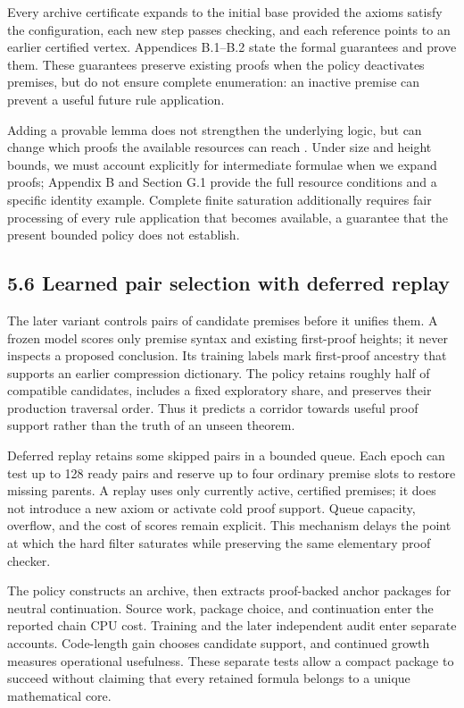 \documentclass[pdflatex,sn-basic,Numbered]{sn-jnl}
\begin{document}
Every archive certificate expands to the initial base provided the axioms satisfy the configuration, each new step passes checking, and each reference points to an earlier certified vertex. Appendices B.1--B.2 state the formal guarantees and prove them. These guarantees preserve existing proofs when the policy deactivates premises, but do not ensure complete enumeration: an inactive premise can prevent a useful future rule application.

Adding a provable lemma does not strengthen the underlying logic, but can change which proofs the available resources can reach \citep{CookReckhow1979}. Under size and height bounds, we must account explicitly for intermediate formulae when we expand proofs; Appendix B and Section G.1 provide the full resource conditions and a specific identity example. Complete finite saturation additionally requires fair processing of every rule application that becomes available, a guarantee that the present bounded policy does not establish.

\subsection*{5.6 Learned pair selection with deferred replay}\label{learned-pair-selection-with-deferred-replay}

The later variant controls pairs of candidate premises before it unifies them. A frozen model scores only premise syntax and existing first-proof heights; it never inspects a proposed conclusion. Its training labels mark first-proof ancestry that supports an earlier compression dictionary. The policy retains roughly half of compatible candidates, includes a fixed exploratory share, and preserves their production traversal order. Thus it predicts a corridor towards useful proof support rather than the truth of an unseen theorem.

Deferred replay retains some skipped pairs in a bounded queue. Each epoch can test up to 128 ready pairs and reserve up to four ordinary premise slots to restore missing parents. A replay uses only currently active, certified premises; it does not introduce a new axiom or activate cold proof support. Queue capacity, overflow, and the cost of scores remain explicit. This mechanism delays the point at which the hard filter saturates while preserving the same elementary proof checker.

The policy constructs an archive, then extracts proof-backed anchor packages for neutral continuation. Source work, package choice, and continuation enter the reported chain CPU cost. Training and the later independent audit enter separate accounts. Code-length gain chooses candidate support, and continued growth measures operational usefulness. These separate tests allow a compact package to succeed without claiming that every retained formula belongs to a unique mathematical core.
\end{document}
